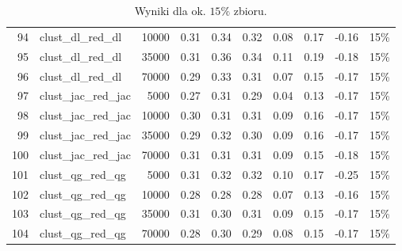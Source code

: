 \documentclass{praca1}
\begin{document}
\begin{table}[!h]
\begin{tabular}{|rlr|rrr|rr|r|r|}
  94 & clust\_dl\_red\_dl & 10000 & 0.31 & 0.34 & 0.32 & 0.08 & 0.17 & -0.16 & 15\% \\ 
  95 & clust\_dl\_red\_dl & 35000 & 0.31 & 0.36 & 0.34 & 0.11 & 0.19 & -0.18 & 15\% \\ 
  96 & clust\_dl\_red\_dl & 70000 & 0.29 & 0.33 & 0.31 & 0.07 & 0.15 & -0.17 & 15\% \\ 
   \hline
97 & clust\_jac\_red\_jac & 5000 & 0.27 & 0.31 & 0.29 & 0.04 & 0.13 & -0.17 & 15\% \\ 
  98 & clust\_jac\_red\_jac & 10000 & 0.30 & 0.31 & 0.31 & 0.09 & 0.16 & -0.17 & 15\% \\ 
  99 & clust\_jac\_red\_jac & 35000 & 0.29 & 0.32 & 0.30 & 0.09 & 0.16 & -0.17 & 15\% \\ 
  100 & clust\_jac\_red\_jac & 70000 & 0.31 & 0.31 & 0.31 & 0.09 & 0.15 & -0.18 & 15\% \\ 
   \hline
101 & clust\_qg\_red\_qg & 5000 & 0.31 & 0.32 & 0.32 & 0.10 & 0.17 & -0.25 & 15\% \\ 
  102 & clust\_qg\_red\_qg & 10000 & 0.28 & 0.28 & 0.28 & 0.07 & 0.13 & -0.16 & 15\% \\ 
  103 & clust\_qg\_red\_qg & 35000 & 0.31 & 0.30 & 0.31 & 0.09 & 0.15 & -0.17 & 15\% \\ 
  104 & clust\_qg\_red\_qg & 70000 & 0.28 & 0.30 & 0.29 & 0.08 & 0.15 & -0.17 & 15\% \\ 
   \hline
\end{tabular}
\caption{Wyniki dla ok. $15\%$ zbioru.}
\label{tab:007}
\end{table}
\end{document}
